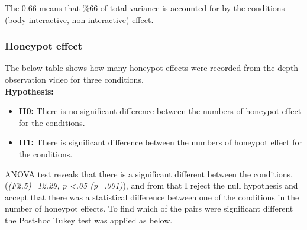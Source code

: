 The 0.66 means that \%66 of total variance is accounted for by the conditions (body interactive, non-interactive) effect.



\subsubsection {Honeypot effect}
The below table shows how many honeypot effects were recorded from the depth observation video for three conditions.\\

\textbf{Hypothesis: }
\begin{itemize}
\item \textbf{H0:} There is no significant difference between the numbers of honeypot effect for the conditions.
\item \textbf{H1:} There is significant difference between the numbers of honeypot effect for the conditions.
\end{itemize}


\begin{table}[H]
\caption{Number of Honeypot effect in three weeks}
\label{tab:landingeffectthreeweeks}
\centering
{}
\end{table}


ANOVA test reveals that there is a significant different between the conditions,(\emph{(F2,5)=12.29, p <.05 (p=.001)}), and from that I reject the null hypothesis and accept that there was a statistical difference between one of the conditions in the number of honeypot effects. To find which of the pairs were significant different the Post-hoc Tukey test was applied as below. 

\begin{table}[H]
\caption{Post-Hoc Tukey’s HSD results}
\label{tab:honeypot-non-posthoctukey}
\centering
{}
\end{table}

